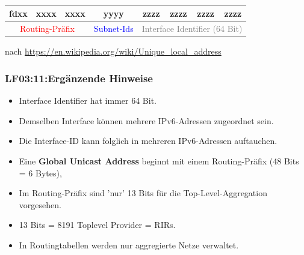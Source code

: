 \begin{frame}[fragile]
\begin{tiny}
\begin{center}
\begin{tabular}{|c|c|c|c|c|c|c|c|c|c|c|c|c|c|c|c|}
       
      \hline
  
      \multicolumn{2}{|c|}{fdxx} & \multicolumn{2}{c|}{xxxx} &
        \multicolumn{2}{c|}{xxxx} & \multicolumn{2}{c|}{yyyy} &
          \multicolumn{2}{c|}{zzzz} & \multicolumn{2}{c|}{zzzz} &
            \multicolumn{2}{c|}{zzzz} & \multicolumn{2}{c|}{zzzz} \\
      \hline
      \multicolumn{6}{|c|}{\tiny{\textcolor{red}{Routing-Präfix}}} &
      \multicolumn{2}{c|}{\tiny{\textcolor{blue}{Subnet-Ids}}} &
      \multicolumn{8}{c|}{\footnotesize{\textcolor{gray}{Interface Identifier (64 Bit)}}}\\  
      \hline
      \end{tabular}
    \end{center}
  \end{tiny}
  
  \vspace{0.4cm}
  \begin{flushright}
  \begin{tiny}
  nach  \href{https://en.wikipedia.org/wiki/Unique\_local\_address}{https://en.wikipedia.org/wiki/Unique\_local\_address}
  \end{tiny}
  \end{flushright}
  \end{frame}
  


\begin{frame}
  \frametitle{LF03:11:Ergänzende Hinweise}
  \begin{footnotesize}
    \begin{itemize}
      \item Interface Identifier hat immer 64 Bit.
      \item Demselben Interface können mehrere IPv6-Adressen zugeordnet sein.
      \item Die Interface-ID kann folglich in mehreren IPv6-Adressen auftauchen.
      \item Eine \textbf{Global Unicast Address} beginnt mit einem Routing-Präfix (48 Bits = 6 Bytes), 
      \item Im Routing-Präfix sind 'nur' 13 Bits für die Top-Level-Aggregation vorgesehen.   
      \item 13 Bits = 8191 Toplevel Provider = RIRs.
      \item In Routingtabellen werden nur aggregierte Netze verwaltet.
    \end{itemize}
  \end{footnotesize}
  \vspace{0.4cm}
  \begin{tiny}
      \cite[vgl. dazu][188ff]{Schreiner2014a}
  \end{tiny}
\end{frame}

